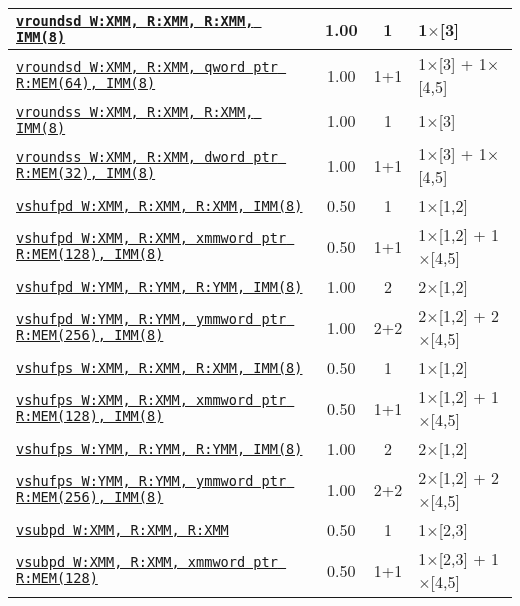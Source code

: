 \documentclass[a4paper,english,fontsize=9]{scrartcl}
\begin{document}
\begin{longtable}{p{}ccL{.25\textwidth}}
  \midrule
  \texttt{\href{https://felixcloutier.com/x86/ROUNDSD.html}{vroundsd W:XMM, R:XMM, R:XMM, IMM(8)}} & 1.00 & 1 & 1\(\times\)[3] \\
  \midrule
  \texttt{\href{https://felixcloutier.com/x86/ROUNDSD.html}{vroundsd W:XMM, R:XMM, qword ptr R:MEM(64), IMM(8)}} & 1.00 & 1+1 & 1\(\times\)[3] + 1\(\times\)[4,5] \\
  \midrule
  \texttt{\href{https://felixcloutier.com/x86/ROUNDSS.html}{vroundss W:XMM, R:XMM, R:XMM, IMM(8)}} & 1.00 & 1 & 1\(\times\)[3] \\
  \midrule
  \texttt{\href{https://felixcloutier.com/x86/ROUNDSS.html}{vroundss W:XMM, R:XMM, dword ptr R:MEM(32), IMM(8)}} & 1.00 & 1+1 & 1\(\times\)[3] + 1\(\times\)[4,5] \\
  \midrule
  \texttt{\href{https://felixcloutier.com/x86/SHUFPD.html}{vshufpd W:XMM, R:XMM, R:XMM, IMM(8)}} & 0.50 & 1 & 1\(\times\)[1,2] \\
  \midrule
  \texttt{\href{https://felixcloutier.com/x86/SHUFPD.html}{vshufpd W:XMM, R:XMM, xmmword ptr R:MEM(128), IMM(8)}} & 0.50 & 1+1 & 1\(\times\)[1,2] + 1\(\times\)[4,5] \\
  \midrule
  \texttt{\href{https://felixcloutier.com/x86/SHUFPD.html}{vshufpd W:YMM, R:YMM, R:YMM, IMM(8)}} & 1.00 & 2 & 2\(\times\)[1,2] \\
  \midrule
  \texttt{\href{https://felixcloutier.com/x86/SHUFPD.html}{vshufpd W:YMM, R:YMM, ymmword ptr R:MEM(256), IMM(8)}} & 1.00 & 2+2 & 2\(\times\)[1,2] + 2\(\times\)[4,5] \\
  \midrule
  \texttt{\href{https://felixcloutier.com/x86/SHUFPS.html}{vshufps W:XMM, R:XMM, R:XMM, IMM(8)}} & 0.50 & 1 & 1\(\times\)[1,2] \\
  \midrule
  \texttt{\href{https://felixcloutier.com/x86/SHUFPS.html}{vshufps W:XMM, R:XMM, xmmword ptr R:MEM(128), IMM(8)}} & 0.50 & 1+1 & 1\(\times\)[1,2] + 1\(\times\)[4,5] \\
  \midrule
  \texttt{\href{https://felixcloutier.com/x86/SHUFPS.html}{vshufps W:YMM, R:YMM, R:YMM, IMM(8)}} & 1.00 & 2 & 2\(\times\)[1,2] \\
  \midrule
  \texttt{\href{https://felixcloutier.com/x86/SHUFPS.html}{vshufps W:YMM, R:YMM, ymmword ptr R:MEM(256), IMM(8)}} & 1.00 & 2+2 & 2\(\times\)[1,2] + 2\(\times\)[4,5] \\
  \midrule
  \texttt{\href{https://felixcloutier.com/x86/SUBPD.html}{vsubpd W:XMM, R:XMM, R:XMM}} & 0.50 & 1 & 1\(\times\)[2,3] \\
  \midrule
  \texttt{\href{https://felixcloutier.com/x86/SUBPD.html}{vsubpd W:XMM, R:XMM, xmmword ptr R:MEM(128)}} & 0.50 & 1+1 & 1\(\times\)[2,3] + 1\(\times\)[4,5] \\

\end{longtable}
\end{document}
